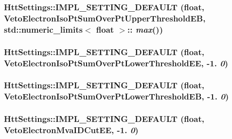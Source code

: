 \label{classHttSettings_a5c7241bf19a2323faada047f5abc5c2d}
\hypertarget{classHttSettings_ac2ca333eba7108844e5ce46288424a36}{
\subsubsection[{IMPL\_\-SETTING\_\-DEFAULT}]{\setlength{\rightskip}{0pt plus 5cm}HttSettings::IMPL\_\-SETTING\_\-DEFAULT (float, \/  VetoElectronIsoPtSumOverPtUpperThresholdEB, \/  std::numeric\_\-limits$<$ float $>$:: {\em max}())}}
\label{classHttSettings_ac2ca333eba7108844e5ce46288424a36}
\hypertarget{classHttSettings_a74114758514943c184cc1353dc74a793}{
\subsubsection[{IMPL\_\-SETTING\_\-DEFAULT}]{\setlength{\rightskip}{0pt plus 5cm}HttSettings::IMPL\_\-SETTING\_\-DEFAULT (float, \/  VetoElectronIsoPtSumOverPtLowerThresholdEE, \/  -\/1. {\em 0})}}
\label{classHttSettings_a74114758514943c184cc1353dc74a793}
\hypertarget{classHttSettings_aefd84ad1695e1bdb04c825ffc3a3f11d}{
\subsubsection[{IMPL\_\-SETTING\_\-DEFAULT}]{\setlength{\rightskip}{0pt plus 5cm}HttSettings::IMPL\_\-SETTING\_\-DEFAULT (float, \/  VetoElectronIsoPtSumOverPtLowerThresholdEB, \/  -\/1. {\em 0})}}
\label{classHttSettings_aefd84ad1695e1bdb04c825ffc3a3f11d}
\hypertarget{classHttSettings_a448ca7df803175d519a22dcd7a9fbc84}{
\subsubsection[{IMPL\_\-SETTING\_\-DEFAULT}]{\setlength{\rightskip}{0pt plus 5cm}HttSettings::IMPL\_\-SETTING\_\-DEFAULT (float, \/  VetoElectronMvaIDCutEE, \/  -\/1. {\em 0})}}
